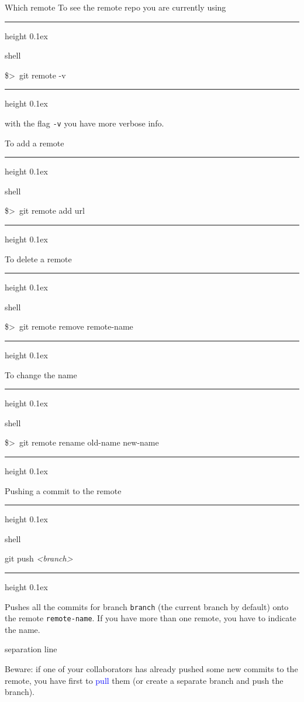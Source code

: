 \documentclass[hyperref={colorlinks}]{beamer}
\newenvironment{shell}{%
\footnotesize\flushleft\hrule height 0.1ex
\tt\begin{beamercolorbox}[sep=1ex,left]{shell}%
}{%
\end{beamercolorbox}
\hrule height 0.1ex
\endflushleft\par
}
\newcommand*{\psone}[1][ant]{\$>~}
\newcommand*{\var}[1]{{\it<#1>}}
\newcommand{\titleline}[1][0.025cm]{%
\begin{beamercolorbox}[wd=\paperwidth,ht=#1,center]{separation line}%
\end{beamercolorbox}%
}
\begin{document}
\begin{frame}{Which remote}
To see the remote repo you are currently using
\begin{shell}
\psone git remote -v 
\end{shell}
with the flag \texttt{-v} you have more verbose info. 
\smallskip

To add a remote
\begin{shell}
\psone git remote add \var{remote-name} url
\end{shell}
To delete a remote
\begin{shell}
\psone git remote remove remote-name
\end{shell}
To change the name
\begin{shell}
\psone git remote rename old-name new-name
\end{shell}
\end{frame}

\begin{frame}{Pushing a commit to the remote}
\begin{shell}
git push \var{remote-name} \var{branch}
\end{shell}
Pushes all the commits for branch \texttt{branch} (the current branch by default) onto the remote \texttt{remote-name}. If you have more than one remote, you have to indicate the name.
\titleline
\medskip

Beware: if one of your collaborators has already pushed some new commits to the remote, you have first to \textcolor{blue}{pull} them (or create a separate branch and push the branch).
\end{frame}
\end{document}
